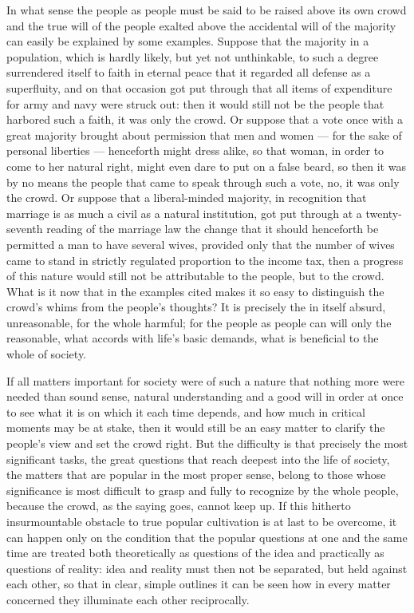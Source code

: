 \documentclass[12pt,a4paper,openany]{book}
\newcommand{\opage}[1]{\marginnote{\footnotesize\textit{[#1]}}}
\begin{document}
In what sense the people as people must be said to
be raised above its own crowd and the true will of the people
exalted above the accidental will of the majority can easily be explained by
some examples. Suppose that the majority in a population, which is
hardly likely, but yet not unthinkable, to such a degree
surrendered itself to faith in eternal peace that it regarded
all defense as a superfluity, and on that occasion
got put through that all items of expenditure for army and
navy were struck out: then it would still not be the people
that harbored such a faith, it was only the crowd.
Or suppose that a vote once with a great majority
brought about permission that men and women ---
for the sake of personal liberties --- henceforth might
dress alike, so that woman, in order to come to her
natural right, might even dare to put on a false beard, so
\setcounter{footnote}{0}%
\opage{36}then it was by no means the people that came to speak through such a
vote, no, it was only the crowd. Or
suppose that a liberal-minded majority, in recognition that marriage
is as much a civil as a natural institution,
got put through at a twenty-seventh reading of the marriage law
the change that it should henceforth
be permitted a man to have several wives,
provided only that the number of wives came to stand in strictly regulated
proportion to the income tax, then a progress of
this nature would still not be attributable to the people, but to
the crowd. What is it now that in the examples cited
makes it so easy to distinguish the crowd's whims from the people's
thoughts? It is precisely the in itself absurd,
unreasonable, for the whole harmful; for the people as people
can will only the reasonable, what accords with life's basic demands,
what is beneficial to the whole of society.

If all matters important for society were
of such a nature that nothing more were needed than sound
sense, natural understanding and a good will in order at once to
see what it is on which it each time depends,
and how much in critical moments may be at stake,
then it would still be an easy matter to clarify the people's
view and set the crowd right. But the difficulty is
that precisely the most significant tasks, the great questions
that reach deepest into the life of society, the matters that are popular
in the most proper sense, belong to those
whose significance is most difficult to grasp and fully to recognize
by the whole people, because the crowd, as the saying goes, cannot
keep up. If this hitherto insurmountable obstacle to true popular cultivation
is at last to be overcome, it can
happen only on the condition that the popular
\setcounter{footnote}{0}%
\opage{37}questions at one and the same time are treated both theoretically
as questions of the idea and practically as questions of reality:
idea and reality must then not be separated, but
held against each other, so that in clear, simple outlines it can
be seen how in every matter concerned they illuminate
each other reciprocally.
\end{document}
